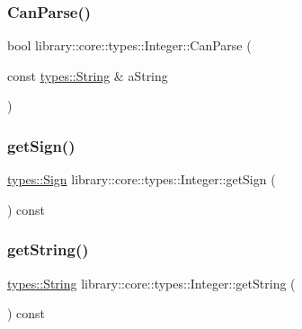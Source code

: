\subsubsection{\texorpdfstring{Can\+Parse()}{CanParse()}\hspace{0.1cm}{\footnotesize\ttfamily [2/2]}}
{\footnotesize\ttfamily bool library\+::core\+::types\+::\+Integer\+::\+Can\+Parse (\begin{DoxyParamCaption}\item[{const \hyperlink{classlibrary_1_1core_1_1types_1_1_string}{types\+::\+String} \&}]{a\+String }\end{DoxyParamCaption})\hspace{0.3cm}{\ttfamily [static]}}

\mbox{\label{classlibrary_1_1core_1_1types_1_1_integer_abe567cca5d1e448329195df5d16d48e6}} 
\subsubsection{\texorpdfstring{get\+Sign()}{getSign()}}
{\footnotesize\ttfamily \hyperlink{namespacelibrary_1_1core_1_1types_a06d9eaa410d43a0fa3f383040618e87d}{types\+::\+Sign} library\+::core\+::types\+::\+Integer\+::get\+Sign (\begin{DoxyParamCaption}{ }\end{DoxyParamCaption}) const}

\mbox{\label{classlibrary_1_1core_1_1types_1_1_integer_a157230adc28642b992041ae299973ddc}} 
\subsubsection{\texorpdfstring{get\+String()}{getString()}}
{\footnotesize\ttfamily \hyperlink{classlibrary_1_1core_1_1types_1_1_string}{types\+::\+String} library\+::core\+::types\+::\+Integer\+::get\+String (\begin{DoxyParamCaption}{ }\end{DoxyParamCaption}) const}

